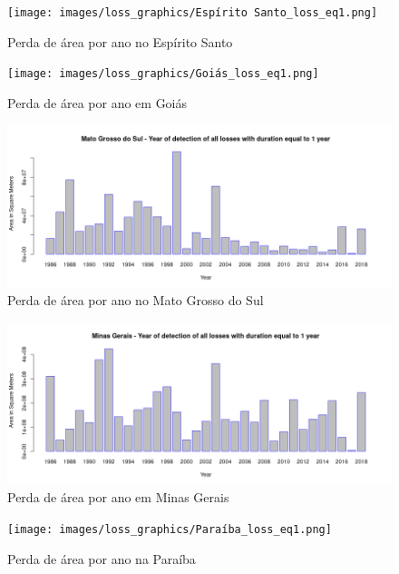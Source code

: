 \begin{figure}[H]
    \centering
    \texttt{[image: images/loss\_graphics/Espírito Santo\_loss\_eq1.png]}
    \caption{Perda de área por ano no Espírito Santo}
    \label{fig:loss_espirito_santo}
\end{figure}

\begin{figure}[H]
    \centering
    \texttt{[image: images/loss\_graphics/Goiás\_loss\_eq1.png]}
    \caption{Perda de área por ano em Goiás}
    \label{fig:loss_goias}
\end{figure}

\begin{figure}[H]
    \centering
    \includegraphics[scale=.5]{images/loss_graphics/Mato Grosso do Sul_loss_eq1.png}
    \caption{Perda de área por ano no Mato Grosso do Sul}
    \label{fig:loss_mato_grosso_sul}
\end{figure}

\begin{figure}[H]
    \centering
    \includegraphics[scale=.5]{images/loss_graphics/Minas Gerais_loss_eq1.png}
    \caption{Perda de área por ano em Minas Gerais}
    \label{fig:loss_minas_gerais}
\end{figure}

\begin{figure}[H]
    \centering
    \texttt{[image: images/loss\_graphics/Paraíba\_loss\_eq1.png]}
    \caption{Perda de área por ano na Paraíba}
    \label{fig:loss_paraiba}
\end{figure}


